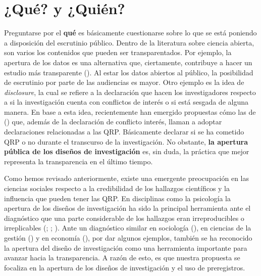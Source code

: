 \documentclass[
  spanish,
  a4paper,
  oneside]{scrbook}
\begin{document}
\section{¿Qué? y ¿Quién?}\label{quuxe9-y-quiuxe9n}

Preguntarse por el \textbf{qué} es básicamente cuestionarse sobre lo que
se está poniendo a disposición del escrutinio público. Dentro de la
literatura sobre ciencia abierta, son varios los contenidos que pueden
ser transparentados. Por ejemplo, la apertura de los datos es una
alternativa que, ciertamente, contribuye a hacer un estudio más
transparente ().
Al estar los datos abiertos al público, la posibilidad de escrutinio por
parte de las audiencias es mayor. Otro ejemplo es la idea de
\emph{disclosure}, la cual se refiere a la declaración que hacen los
investigadores respecto a si la investigación cuenta con conflictos de
interés o si está sesgada de alguna manera. En base a esta idea,
recientemente han emergido propuestas cómo las de
() que, además de la declaración de conflicto interés, llaman a
adoptar declaraciones relacionadas a las QRP. Básicamente declarar si se
ha cometido QRP o no durante el transcurso de la investigación. No
obstante, \textbf{la apertura pública de los diseños de investigación}
es, sin duda, la práctica que mejor representa la transparencia en el
último tiempo.

Como hemos revisado anteriormente, existe una emergente preocupación en
las ciencias sociales respecto a la credibilidad de los hallazgos
científicos y la influencia que pueden tener las QRP. En disciplinas
como la psicología la apertura de los diseños de investigación ha sido
la principal herramienta ante el diagnóstico que una parte considerable
de los hallazgos eran irreproducibles o irreplicables
(;
;
). Ante un
diagnóstico similar en sociología
(), en
ciencias de la gestión () y en economía (), por dar algunos ejemplos, también se ha
reconocido la apertura del diseño de investigación como una herramienta
importante para avanzar hacia la transparencia. A razón de esto, es que
nuestra propuesta se focaliza en la apertura de los diseños de
investigación y el uso de preregistros.
\end{document}

